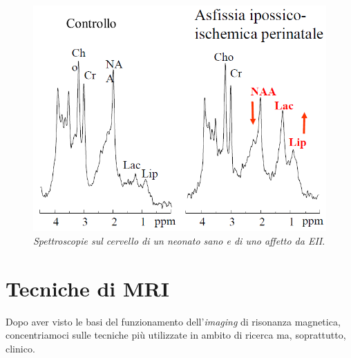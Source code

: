 \documentclass{report}
\numberwithin{equation}{section}
\numberwithin{figure}{section}
\begin{document}
\begin{figure}[htp]
\centering
\includegraphics[scale=0.7]{immagini/asfissia.png}
\caption{\label{fig:asfissia} \textit{Spettroscopie sul cervello di un neonato sano e di uno affetto da EII}.}
\end{figure}

\section{Tecniche di MRI}
Dopo aver visto le basi del funzionamento dell'\textit{imaging} di risonanza magnetica, concentriamoci sulle tecniche più utilizzate in ambito di ricerca ma, soprattutto, clinico. 
\end{document}
